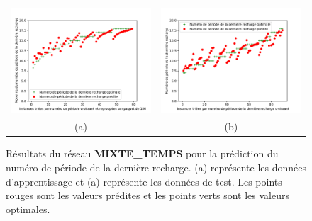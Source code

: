 \begin{figure}[H]
	\centering
	\begin{tabular}{c c}
		\includegraphics[width=9cm]{images_these/time_6000_prediction_courbe_Al_He_complet_train.pdf}&
		\includegraphics[width=9cm]{images_these/time_6000_prediction_courbe_Al_He_complet_test.pdf}
		\\
		(a) & (b)
	\end{tabular}
	\caption[Résultats du  réseau MIXTE\_TEMPS]{Résultats du  réseau \textbf{MIXTE\_TEMPS} pour la prédiction du numéro de période de la dernière recharge. (a) représente les données d'apprentissage et (a) représente les données de test. Les points rouges sont les valeurs prédites et les points verts sont les valeurs optimales.}\label{time_6000_prediction_courbe_Al_He_complet}
\end{figure}
%
